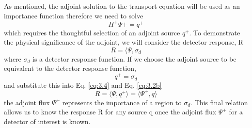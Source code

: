 As mentioned, the adjoint solution to the transport
equation will be used as an importance function therefore we need to solve
\begin{equation} \label{eq:3.3}
		H^{+}\Psi{+} = q^{+}
\end{equation}
which requires the thoughtful selection of an adjoint source $q^{+}$.
To demonstrate the physical significance of the adjoint, we will consider the
detector response, R
\begin{equation} \label{eq:3.4}
		R = \langle \Psi, \sigma_{d}
\end{equation}
where $\sigma_{d}$ is a detector response function.
If we choose the adjoint source to be equivalent to the detector response
function,
\begin{equation} \label{eq:3.5}
		q^{+} = \sigma_{d}
\end{equation}
and substitute this into Eq. \ref{eq:3.4} and Eq. \ref{eq:3.2b} 
\begin{equation}
		R = \langle \Psi, q^{+} \rangle = \langle \Psi^{+}, q \rangle
\end{equation}
the adjoint flux $\Psi^{+}$ represents the importance of a region to
$\sigma_{d}$.
This final relation allows us to know the response R for any source q once the
adjoint flux $\Psi^{+}$ for a detector of interest is known.

